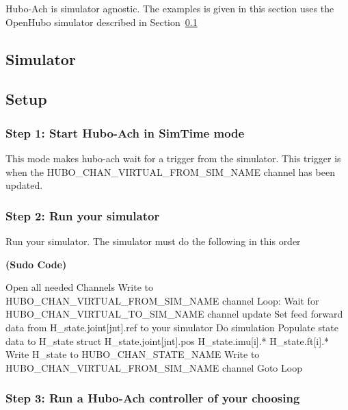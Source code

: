 Hubo-Ach is simulator agnostic. The examples is given in this section uses the OpenHubo simulator described in Section~\ref{sec:simulator}

\subsection{Simulator}\label{sec:simulator}
	
	
	

\subsection{Setup}

\subsubsection{Step 1: Start Hubo-Ach in SimTime mode}

This mode makes hubo-ach wait for a trigger from the simulator. This trigger is when the HUBO\_CHAN\_VIRTUAL\_FROM\_SIM\_NAME channel has been updated.


\subsubsection{Step 2: Run your simulator}

Run your simulator. The simulator must do the following in this order


\footnotesize
\noindent \textbf{(Sudo Code)}
\vspace{-6mm}
\begin{code}
Open all needed Channels
Write to HUBO_CHAN_VIRTUAL_FROM_SIM_NAME channel
Loop:
    Wait for HUBO_CHAN_VIRTUAL_TO_SIM_NAME channel update
    Set feed forward data from H_state.joint[jnt].ref to your simulator
    Do simulation
    Populate state data to H_state struct
        H_state.joint[jnt].pos
        H_state.imu[i].*
        H_state.ft[i].*
    Write H_state to HUBO_CHAN_STATE_NAME
    Write to HUBO_CHAN_VIRTUAL_FROM_SIM_NAME channel
    Goto Loop
\end{code}
\normalsize




\subsubsection{Step 3: Run a Hubo-Ach controller of your choosing}


